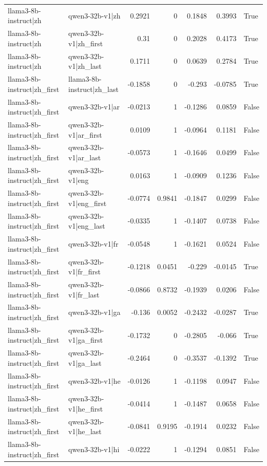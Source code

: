 \begin{table}
\begin{tabular}{l l r r r r l}
llama3-8b-instruct|zh & qwen3-32b-v1|zh & 0.2921 & 0 & 0.1848 & 0.3993 & True \\
llama3-8b-instruct|zh & qwen3-32b-v1|zh_first & 0.31 & 0 & 0.2028 & 0.4173 & True \\
llama3-8b-instruct|zh & qwen3-32b-v1|zh_last & 0.1711 & 0 & 0.0639 & 0.2784 & True \\
llama3-8b-instruct|zh_first & llama3-8b-instruct|zh_last & -0.1858 & 0 & -0.293 & -0.0785 & True \\
llama3-8b-instruct|zh_first & qwen3-32b-v1|ar & -0.0213 & 1 & -0.1286 & 0.0859 & False \\
llama3-8b-instruct|zh_first & qwen3-32b-v1|ar_first & 0.0109 & 1 & -0.0964 & 0.1181 & False \\
llama3-8b-instruct|zh_first & qwen3-32b-v1|ar_last & -0.0573 & 1 & -0.1646 & 0.0499 & False \\
llama3-8b-instruct|zh_first & qwen3-32b-v1|eng & 0.0163 & 1 & -0.0909 & 0.1236 & False \\
llama3-8b-instruct|zh_first & qwen3-32b-v1|eng_first & -0.0774 & 0.9841 & -0.1847 & 0.0299 & False \\
llama3-8b-instruct|zh_first & qwen3-32b-v1|eng_last & -0.0335 & 1 & -0.1407 & 0.0738 & False \\
llama3-8b-instruct|zh_first & qwen3-32b-v1|fr & -0.0548 & 1 & -0.1621 & 0.0524 & False \\
llama3-8b-instruct|zh_first & qwen3-32b-v1|fr_first & -0.1218 & 0.0451 & -0.229 & -0.0145 & True \\
llama3-8b-instruct|zh_first & qwen3-32b-v1|fr_last & -0.0866 & 0.8732 & -0.1939 & 0.0206 & False \\
llama3-8b-instruct|zh_first & qwen3-32b-v1|ga & -0.136 & 0.0052 & -0.2432 & -0.0287 & True \\
llama3-8b-instruct|zh_first & qwen3-32b-v1|ga_first & -0.1732 & 0 & -0.2805 & -0.066 & True \\
llama3-8b-instruct|zh_first & qwen3-32b-v1|ga_last & -0.2464 & 0 & -0.3537 & -0.1392 & True \\
llama3-8b-instruct|zh_first & qwen3-32b-v1|he & -0.0126 & 1 & -0.1198 & 0.0947 & False \\
llama3-8b-instruct|zh_first & qwen3-32b-v1|he_first & -0.0414 & 1 & -0.1487 & 0.0658 & False \\
llama3-8b-instruct|zh_first & qwen3-32b-v1|he_last & -0.0841 & 0.9195 & -0.1914 & 0.0232 & False \\
llama3-8b-instruct|zh_first & qwen3-32b-v1|hi & -0.0222 & 1 & -0.1294 & 0.0851 & False \\

\end{tabular}
\end{table}
